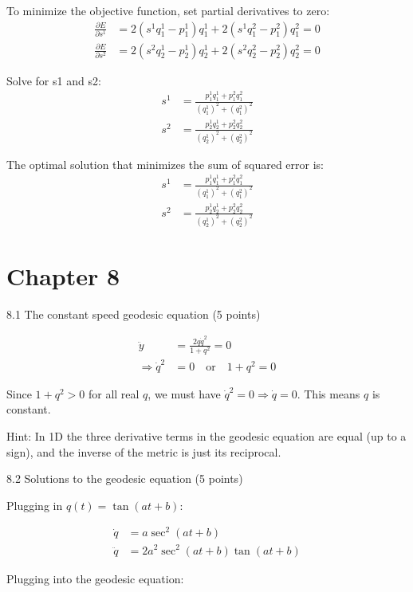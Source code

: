 \documentclass{article}
\begin{document}
To minimize the objective function, set partial derivatives to zero:
\begin{align*}
\frac{\partial E}{\partial s^1} &= 2(s^1q_1^1 - p_1^1)q_1^1 + 2(s^1q_1^2 - p_1^2)q_1^2 = 0\\
\frac{\partial E}{\partial s^2} &= 2(s^2q_2^1 - p_2^1)q_2^1 + 2(s^2q_2^2 - p_2^2)q_2^2 = 0
\end{align*}

Solve for s1 and s2:
\begin{align*}
s^1 &= \frac{p_1^1q_1^1 + p_1^2q_1^2}{(q_1^1)^2 + (q_1^2)^2}\\
s^2 &= \frac{p_2^1q_2^1 + p_2^2q_2^2}{(q_2^1)^2 + (q_2^2)^2}
\end{align*}

The optimal solution that minimizes the sum of squared error is:
\begin{align*}
s^1 &= \frac{p_1^1q_1^1 + p_1^2q_1^2}{(q_1^1)^2 + (q_1^2)^2}\\
s^2 &= \frac{p_2^1q_2^1 + p_2^2q_2^2}{(q_2^1)^2 + (q_2^2)^2}
\end{align*}

\newpage
\section{Chapter 8}

8.1 The constant speed geodesic equation (5 points)

\begin{align*}
\ddot{y} &= \frac{2q\dot{q}^2}{1+q^2} = 0 \\
\Rightarrow \dot{q}^2 &= 0 \quad \text{or} \quad 1+q^2 = 0
\end{align*}

Since $1+q^2 > 0$ for all real $q$, we must have $\dot{q}^2 = 0 \Rightarrow \dot{q} = 0$. This means $q$ is constant.

Hint: In 1D the three derivative terms in the geodesic equation are equal (up to a sign), and the inverse of the metric is just its reciprocal.

8.2 Solutions to the geodesic equation (5 points)

Plugging in $q(t) = \tan(at+b)$:

\begin{align*}
\dot{q} &= a \sec^2(at+b) \\
\ddot{q} &= 2a^2 \sec^2(at+b) \tan(at+b)
\end{align*}

Plugging into the geodesic equation:
\end{document}
